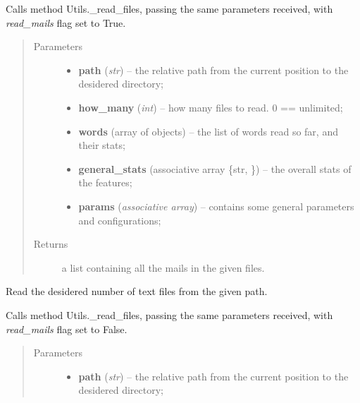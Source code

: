 \documentclass[letterpaper,10pt,english]{sphinxmanual}
\begin{document}
\begin{fulllineitems}
\begin{fulllineitems}
Calls method Utils.\_read\_files, passing the same parameters received,
with \emph{read\_mails} flag set to True.
\begin{quote}\begin{description}
\item[{Parameters}] \leavevmode\begin{itemize}
\item {} 
\textbf{path} (\emph{str}) -- the relative path from the current position to the                 desidered directory;

\item {} 
\textbf{how\_many} (\emph{int}) -- how many files to read. 0 == unlimited;

\item {} 
\textbf{words} (array of {\hyperref[index:gen_stat.Word]{}} objects) -- the list of words read so far, and their stats;

\item {} 
\textbf{general\_stats} (associative array \{str, {\hyperref[index:gen_stat.Stat]{}}\}) -- the overall stats of the features;

\item {} 
\textbf{params} (\emph{associative array}) -- contains some general parameters and configurations;

\end{itemize}

\item[{Returns}] \leavevmode
a list containing all the mails in the given files.

\end{description}\end{quote}

\end{fulllineitems}


\begin{fulllineitems}
\label{index:utils.Utils.read_text}
Read the desidered number of text files from the given path.

Calls method Utils.\_read\_files, passing the same parameters received,
with \emph{read\_mails} flag set to False.
\begin{quote}\begin{description}
\item[{Parameters}] \leavevmode\begin{itemize}
\item {} 
\textbf{path} (\emph{str}) -- the relative path from the current position                 to the desidered directory;


\end{itemize}
\end{description}
\end{quote}
\end{fulllineitems}
\end{fulllineitems}
\end{document}
